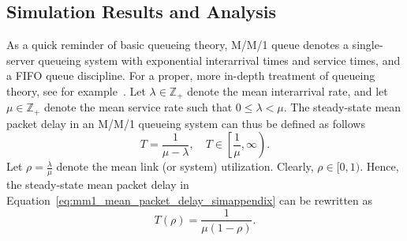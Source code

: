 \subsection{Simulation Results and Analysis}
\label{sub:simulation_results_and_analysis_simappendix}
As a quick reminder of basic queueing theory, M/M/1 queue denotes a single-server queueing system with exponential interarrival times and service times, and a FIFO queue discipline. For a proper, more in-depth treatment of queueing theory, see for example~\cite{CassandrasLafortune2008}. Let $\lambda\in\mathbb{Z}_+$ denote the mean interarrival rate, and let $\mu\in\mathbb{Z}_+$ denote the mean service rate such that $0 \le \lambda < \mu$. The steady-state mean packet delay in an M/M/1 queueing system can thus be defined as follows
\begin{equation}
	\label{eq:mm1_mean_packet_delay_simappendix}
	T = \frac{1}{\mu - \lambda},\quad T\in\displaystyle\left[\frac{1}{\mu}, \infty\right).
\end{equation}
Let $\rho = \displaystyle\frac{\lambda}{\mu}$ denote the mean link (or system) utilization. Clearly, $\rho\in [0,1)$. Hence, the steady-state mean packet delay in Equation~\eqref{eq:mm1_mean_packet_delay_simappendix} can be rewritten as
\begin{equation}
	\label{eq:mm1_mean_packet_delay_2_simappendix}
	T(\rho) = \frac{1}{\mu(1 - \rho)}.
\end{equation}

